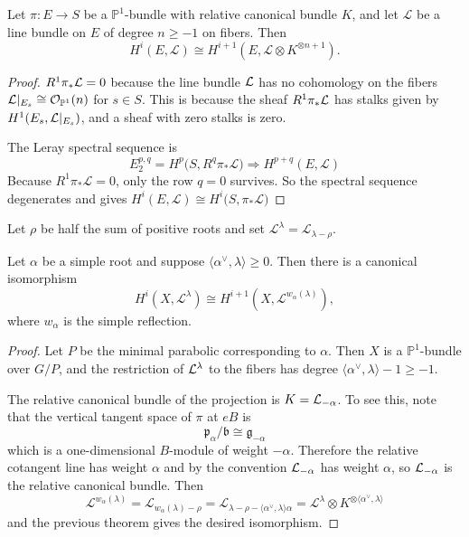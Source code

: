 \documentclass[12pt]{article}
\begin{document}
\begin{theorem}
Let $\pi : E \to S$ be a $\mathbb P^1$-bundle with relative canonical bundle $K$, and let $\mathcal L$ be a line bundle on $E$ of degree $n \ge -1$ on fibers. Then
\[
H^i(E,\mathcal L) \cong H^{i+1}(E,\mathcal L \otimes K^{\otimes n+1}).
\]
\end{theorem}

\begin{proof}
    $R^1\pi_*{\mathcal{L}} = 0$ because the line bundle ${\mathcal{L}}$ has no cohomology on the fibers ${\mathcal{L}}|_{E_s} \cong {\mathcal{O}}_{\mathbb{P}^1}(n)$ for $s \in S$. This is because the sheaf $R^1\pi_*{\mathcal{L}}$ has stalks given by $H^1(E_s,{\mathcal{L}}|_{E_s})$, and a sheaf with zero stalks is zero. 

    The Leray spectral sequence is
\[E_2^{p,q}=H^p\bigl(S,R^q\pi_*\mathcal L\bigr)\Longrightarrow H^{p+q}(E,\mathcal L)\]
Because $R^1\pi_*\mathcal L=0$, only the row $q=0$ survives. So the spectral sequence degenerates and gives $H^i(E,\mathcal L)\cong H^i\bigl(S,\pi_*\mathcal L\bigr)$
\end{proof}

Let $\rho$ be half the sum of positive roots and set $\mathcal L^\lambda = \mathcal L_{\lambda-\rho}$.

\begin{lemma}
Let $\alpha$ be a simple root and suppose $\langle \alpha^\vee,\lambda\rangle \ge 0$. Then there is a canonical isomorphism
\[
H^i(X,\mathcal L^\lambda) \cong H^{i+1}(X,\mathcal L^{w_\alpha(\lambda)}),
\]
where $w_\alpha$ is the simple reflection.
\end{lemma}

\begin{proof}
Let $P$ be the minimal parabolic corresponding to $\alpha$. Then $X$ is a $\mathbb P^1$-bundle over $G/P$, and the restriction of ${\mathcal{L}}^\lambda$ to the fibers has degree $\langle \alpha^\vee,\lambda\rangle - 1 \geq -1$.

The relative canonical bundle of the projection is $K = {\mathcal{L}}_{-\alpha}$. To see this, note that the vertical tangent space of $\pi$ at $eB$ is
\[\mathfrak p_\alpha/\mathfrak b \cong \mathfrak g_{-\alpha}\]
which is a one-dimensional $B$-module of weight $-\alpha$. Therefore the relative cotangent line has weight $\alpha$ and by the convention ${\mathcal{L}}_{-\alpha}$ has weight $\alpha$, so ${\mathcal{L}}_{-\alpha}$ is the relative canonical bundle.
Then
\[
\mathcal L^{w_\alpha(\lambda)}
=
\mathcal L_{w_\alpha(\lambda)-\rho}
=
\mathcal L_{\lambda - \rho - \langle \alpha^\vee,\lambda\rangle \alpha}
=
\mathcal L^\lambda \otimes K^{\otimes \langle \alpha^\vee,\lambda\rangle}
\] and the previous theorem gives the desired isomorphism.
\end{proof}
\end{document}
